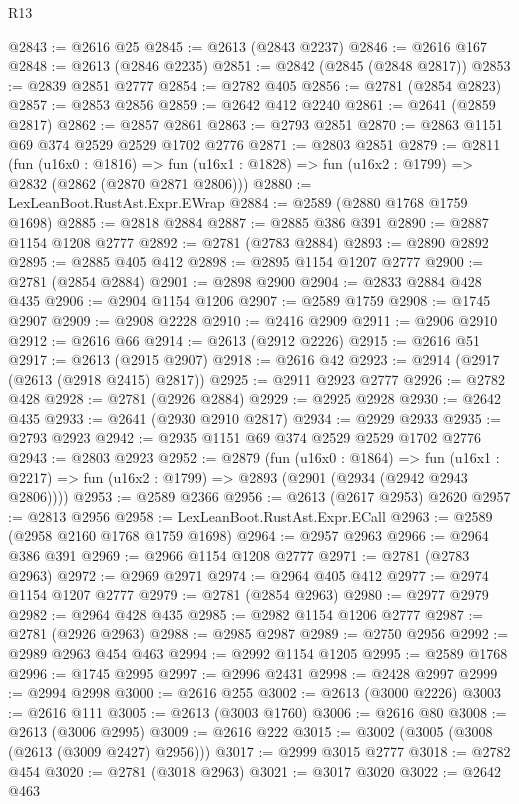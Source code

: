 \begin{lexlean}{R13}
\begin{coremodule}
@2843 := @2616 @25
@2845 := @2613 (@2843 @2237)
@2846 := @2616 @167
@2848 := @2613 (@2846 @2235)
@2851 := @2842 (@2845 (@2848 @2817))
@2853 := @2839 @2851 @2777
@2854 := @2782 @405
@2856 := @2781 (@2854 @2823)
@2857 := @2853 @2856
@2859 := @2642 @412 @2240
@2861 := @2641 (@2859 @2817)
@2862 := @2857 @2861
@2863 := @2793 @2851
@2870 := @2863 @1151 @69 @374 @2529 @2529 @1702 @2776
@2871 := @2803 @2851
@2879 := @2811
    (fun (u16x0 : @1816) =>
    fun (u16x1 : @1828) => fun (u16x2 : @1799) => @2832 (@2862 (@2870 @2871 @2806)))
@2880 := LexLeanBoot.RustAst.Expr.EWrap
@2884 := @2589 (@2880 @1768 @1759 @1698)
@2885 := @2818 @2884
@2887 := @2885 @386 @391
@2890 := @2887 @1154 @1208 @2777
@2892 := @2781 (@2783 @2884)
@2893 := @2890 @2892
@2895 := @2885 @405 @412
@2898 := @2895 @1154 @1207 @2777
@2900 := @2781 (@2854 @2884)
@2901 := @2898 @2900
@2904 := @2833 @2884 @428 @435
@2906 := @2904 @1154 @1206
@2907 := @2589 @1759
@2908 := @1745 @2907
@2909 := @2908 @2228
@2910 := @2416 @2909
@2911 := @2906 @2910
@2912 := @2616 @66
@2914 := @2613 (@2912 @2226)
@2915 := @2616 @51
@2917 := @2613 (@2915 @2907)
@2918 := @2616 @42
@2923 := @2914 (@2917 (@2613 (@2918 @2415) @2817))
@2925 := @2911 @2923 @2777
@2926 := @2782 @428
@2928 := @2781 (@2926 @2884)
@2929 := @2925 @2928
@2930 := @2642 @435
@2933 := @2641 (@2930 @2910 @2817)
@2934 := @2929 @2933
@2935 := @2793 @2923
@2942 := @2935 @1151 @69 @374 @2529 @2529 @1702 @2776
@2943 := @2803 @2923
@2952 := @2879
    (fun (u16x0 : @1864) =>
    fun (u16x1 : @2217) => fun (u16x2 : @1799) => @2893 (@2901 (@2934 (@2942 @2943 @2806))))
@2953 := @2589 @2366
@2956 := @2613 (@2617 @2953) @2620
@2957 := @2813 @2956
@2958 := LexLeanBoot.RustAst.Expr.ECall
@2963 := @2589 (@2958 @2160 @1768 @1759 @1698)
@2964 := @2957 @2963
@2966 := @2964 @386 @391
@2969 := @2966 @1154 @1208 @2777
@2971 := @2781 (@2783 @2963)
@2972 := @2969 @2971
@2974 := @2964 @405 @412
@2977 := @2974 @1154 @1207 @2777
@2979 := @2781 (@2854 @2963)
@2980 := @2977 @2979
@2982 := @2964 @428 @435
@2985 := @2982 @1154 @1206 @2777
@2987 := @2781 (@2926 @2963)
@2988 := @2985 @2987
@2989 := @2750 @2956
@2992 := @2989 @2963 @454 @463
@2994 := @2992 @1154 @1205
@2995 := @2589 @1768
@2996 := @1745 @2995
@2997 := @2996 @2431
@2998 := @2428 @2997
@2999 := @2994 @2998
@3000 := @2616 @255
@3002 := @2613 (@3000 @2226)
@3003 := @2616 @111
@3005 := @2613 (@3003 @1760)
@3006 := @2616 @80
@3008 := @2613 (@3006 @2995)
@3009 := @2616 @222
@3015 := @3002 (@3005 (@3008 (@2613 (@3009 @2427) @2956)))
@3017 := @2999 @3015 @2777
@3018 := @2782 @454
@3020 := @2781 (@3018 @2963)
@3021 := @3017 @3020
@3022 := @2642 @463

\end{coremodule}
\end{lexlean}
